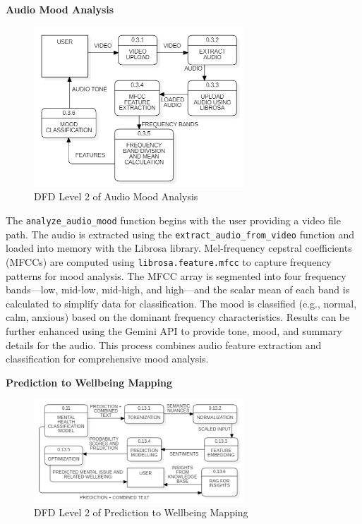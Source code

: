 \vspace{2em}

\noindent
\textbf{Audio Mood Analysis}

\begin{figure}[h!]  
    \centering
    \includegraphics[width=0.7\textwidth]{Images/DFD L2 AM.png}  
    \caption{DFD Level 2 of Audio Mood Analysis}
    \label{dfdl671}  %
\end{figure}

\pagebreak

\noindent
The \texttt{analyze\_audio\_mood} function begins with the user providing a video file path. The audio is extracted using the \texttt{extract\_audio\_from\_video} function and loaded into memory with the Librosa library. Mel-frequency cepstral coefficients (MFCCs) are computed using \texttt{librosa.feature.mfcc} to capture frequency patterns for mood analysis. The MFCC array is segmented into four frequency bands—low, mid-low, mid-high, and high—and the scalar mean of each band is calculated to simplify data for classification. The mood is classified (e.g., normal, calm, anxious) based on the dominant frequency characteristics. Results can be further enhanced using the Gemini API to provide tone, mood, and summary details for the audio. This process combines audio feature extraction and classification for comprehensive mood analysis.

\vspace{2em}

\noindent
\textbf{Prediction to Wellbeing Mapping}

\begin{figure}[h!]  
    \centering
    \includegraphics[width=0.7\textwidth]{Images/DFD L2 MW.png}  
    \caption{DFD Level 2 of Prediction to Wellbeing Mapping}
    \label{dfdl166}  %
\end{figure}

